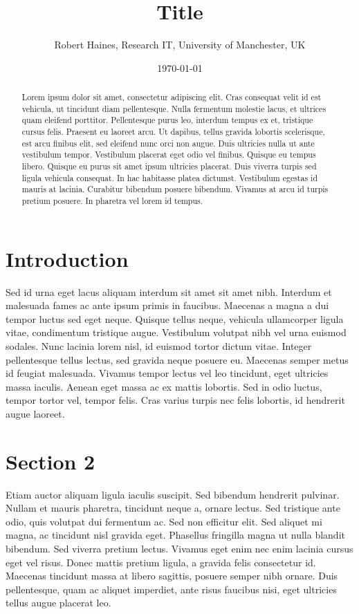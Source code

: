 \documentclass[11pt,a4paper]{article}
\begin{document}
\title{Title}
\author{Robert Haines, Research IT, University of Manchester, UK}
\date{\today}
\maketitle

\begin{abstract}
Lorem ipsum dolor sit amet, consectetur adipiscing elit. Cras consequat velit id est vehicula, ut tincidunt diam pellentesque. Nulla fermentum molestie lacus, et ultrices quam eleifend porttitor. Pellentesque purus leo, interdum tempus ex et, tristique cursus felis. Praesent eu laoreet arcu. Ut dapibus, tellus gravida lobortis scelerisque, est arcu finibus elit, sed eleifend nunc orci non augue. Duis ultricies nulla ut ante vestibulum tempor. Vestibulum placerat eget odio vel finibus. Quisque eu tempus libero. Quisque eu purus sit amet ipsum ultricies placerat. Duis viverra turpis sed ligula vehicula consequat. In hac habitasse platea dictumst. Vestibulum egestas id mauris at lacinia. Curabitur bibendum posuere bibendum. Vivamus at arcu id turpis pretium posuere. In pharetra vel lorem id tempus.
\end{abstract}

\section{Introduction}

Sed id urna eget lacus aliquam interdum sit amet sit amet nibh. Interdum et malesuada fames ac ante ipsum primis in faucibus. Maecenas a magna a dui tempor luctus sed eget neque. Quisque tellus neque, vehicula ullamcorper ligula vitae, condimentum tristique augue. Vestibulum volutpat nibh vel urna euismod sodales. Nunc lacinia lorem nisl, id euismod tortor dictum vitae. Integer pellentesque tellus lectus, sed gravida neque posuere eu. Maecenas semper metus id feugiat malesuada. Vivamus tempor lectus vel leo tincidunt, eget ultricies massa iaculis. Aenean eget massa ac ex mattis lobortis. Sed in odio luctus, tempor tortor vel, tempor felis. Cras varius turpis nec felis lobortis, id hendrerit augue laoreet.

\section{Section 2}

Etiam auctor aliquam ligula iaculis suscipit. Sed bibendum hendrerit pulvinar. Nullam et mauris pharetra, tincidunt neque a, ornare lectus. Sed tristique ante odio, quis volutpat dui fermentum ac. Sed non efficitur elit. Sed aliquet mi magna, ac tincidunt nisl gravida eget. Phasellus fringilla magna ut nulla blandit bibendum. Sed viverra pretium lectus. Vivamus eget enim nec enim lacinia cursus eget vel risus. Donec mattis pretium ligula, a gravida felis consectetur id. Maecenas tincidunt massa at libero sagittis, posuere semper nibh ornare. Duis pellentesque, quam ac aliquet imperdiet, ante risus faucibus nisi, eget ultricies tellus augue placerat leo.
\end{document}
